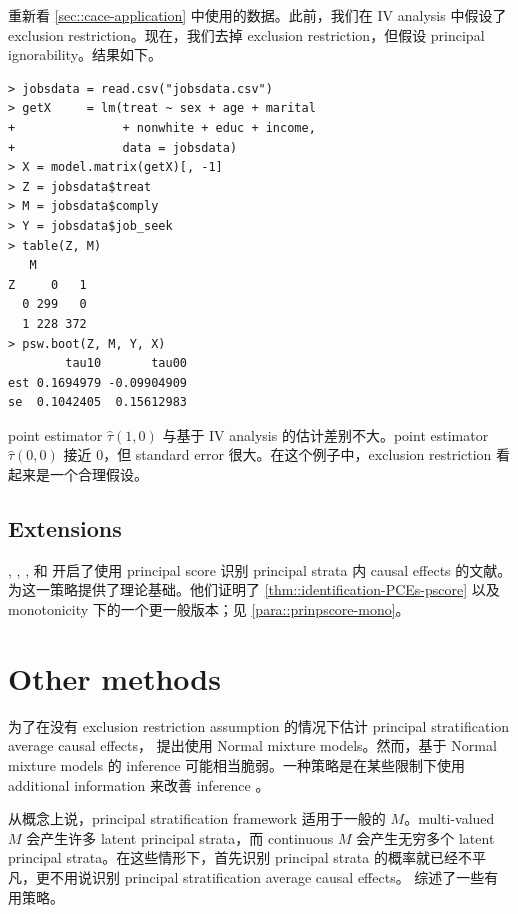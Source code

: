     
重新看 \cref{sec::cace-application} 中使用的数据。此前，我们在 IV analysis 中假设了 exclusion restriction。现在，我们去掉 exclusion restriction，但假设 principal ignorability。结果如下。


 \begin{lstlisting}
> jobsdata = read.csv("jobsdata.csv")
> getX     = lm(treat ~ sex + age + marital 
+               + nonwhite + educ + income,
+               data = jobsdata)
> X = model.matrix(getX)[, -1]
> Z = jobsdata$treat
> M = jobsdata$comply
> Y = jobsdata$job_seek
> table(Z, M)
   M
Z     0   1
  0 299   0
  1 228 372
> psw.boot(Z, M, Y, X)
        tau10       tau00
est 0.1694979 -0.09904909
se  0.1042405  0.15612983
\end{lstlisting}
        

point estimator $\hat \tau(1,0)$ 与基于 IV analysis 的估计差别不大。point estimator $\hat \tau(0,0)$ 接近 0，但 standard error 很大。在这个例子中，exclusion restriction 看起来是一个合理假设。
        
              
    
\subsection{Extensions}

 
 
 
 \citet{follmann2000effect}, \citet{hill2002differential}, \citet{jo2009use}, \citet{jo2011use} 和 \citet{stuart2015assessing} 开启了使用 principal score 识别 principal strata 内 causal effects 的文献。\citet{ding2017principal} 为这一策略提供了理论基础。他们证明了 \cref{thm::identification-PCEs-pscore} 以及 monotonicity 下的一个更一般版本；见 \cref{para::prinpscore-mono}。

 

\section{Other methods}


为了在没有 exclusion restriction assumption 的情况下估计 principal stratification average causal effects，\citet{zhang2009likelihood} 提出使用 Normal mixture models。然而，基于 Normal mixture models 的 inference 可能相当脆弱。一种策略是在某些限制下使用 additional information 来改善 inference \citep{ding2011identifiability, mealli2013using, mattei2013exploiting, jiang2016principal}。
 
 
从概念上说，principal stratification framework 适用于一般的 $M$。multi-valued $M$ 会产生许多 latent principal strata，而 continuous $M$ 会产生无穷多个 latent principal strata。在这些情形下，首先识别 principal strata 的概率就已经不平凡，更不用说识别 principal stratification average causal effects。\citet{jiang2020identification} 综述了一些有用策略。
 


